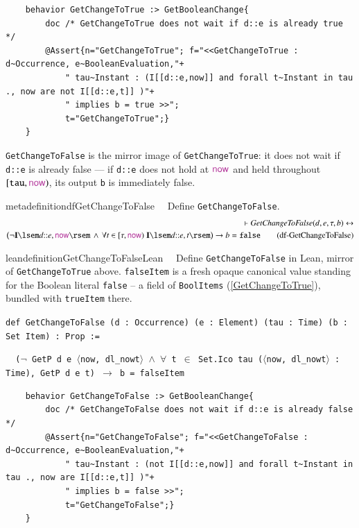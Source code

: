 \begin{lstlisting}
	behavior GetChangeToTrue :> GetBooleanChange{
		doc /* GetChangeToTrue does not wait if d::e is already true */
		@Assert{n="GetChangeToTrue"; f="<<GetChangeToTrue : d~Occurrence, e~BooleanEvaluation,"+
			" tau~Instant : (I[[d::e,now]] and forall t~Instant in tau ., now are not I[[d::e,t]] )"+
			" implies b = true >>";
			t="GetChangeToTrue";}
	}
\end{lstlisting}

\pn \texttt{GetChangeToFalse} is the mirror image of \texttt{GetChangeToTrue}: it does not wait if
\texttt{d::e} is already false --- if \texttt{d::e} does not hold at $\mathsf{\mc{now}}$ and held throughout
$[\texttt{tau},\mathsf{\mc{now}})$, its output \texttt{b} is immediately false.

\begin{restatable}{metadefinition}{dfGetChangeToFalse}~~ Define
\texttt{GetChangeToFalse}.
\begin{align}
\vdash \textit{GetChangeToFalse}(d,e,\tau,b) \leftrightarrow \notag \\
  \big( \lnot \mathbf{I}\lsem d{::}e,\mathsf{\mc{now}}\rsem \, \wedge \,
  \forall t \in [\tau,\mathsf{\mc{now}}) \; \mathbf{I}\lsem d{::}e,t\rsem \big)
  \rightarrow b = \texttt{false}
\label{eq:df-GetChangeToFalse}\tag{df-GetChangeToFalse}
\end{align}
\end{restatable}

\begin{restatable}{leandefinition}{GetChangeToFalseLean}~~ Define
\texttt{GetChangeToFalse} in Lean, mirror of \texttt{GetChangeToTrue} above. \texttt{falseItem} is a fresh
opaque canonical value standing for the Boolean literal \texttt{false} -- a field of \texttt{BoolItems}
(\ref{GetChangeToTrue}), bundled with \texttt{trueItem} there.

\texttt{\textcolor{leancolor}{def} \textcolor{leanyellow}{GetChangeToFalse} (d : Occurrence) (e : Element) (tau : Time) (b : Set Item) : Prop :=}

\texttt{~~($\lnot$ GetP d e $\langle$now, dl\_nowt$\rangle$ $\wedge$ $\forall$ t $\in$ Set.Ico tau
($\langle$now, dl\_nowt$\rangle$ : Time), GetP d e t) $\to$ b = falseItem}
\label{GetChangeToFalse}
\end{restatable}

\begin{lstlisting}
	behavior GetChangeToFalse :> GetBooleanChange{
		doc /* GetChangeToFalse does not wait if d::e is already false */
		@Assert{n="GetChangeToFalse"; f="<<GetChangeToFalse : d~Occurrence, e~BooleanEvaluation,"+
			" tau~Instant : (not I[[d::e,now]] and forall t~Instant in tau ., now are I[[d::e,t]] )"+
			" implies b = false >>";
			t="GetChangeToFalse";}
	}
\end{lstlisting}


